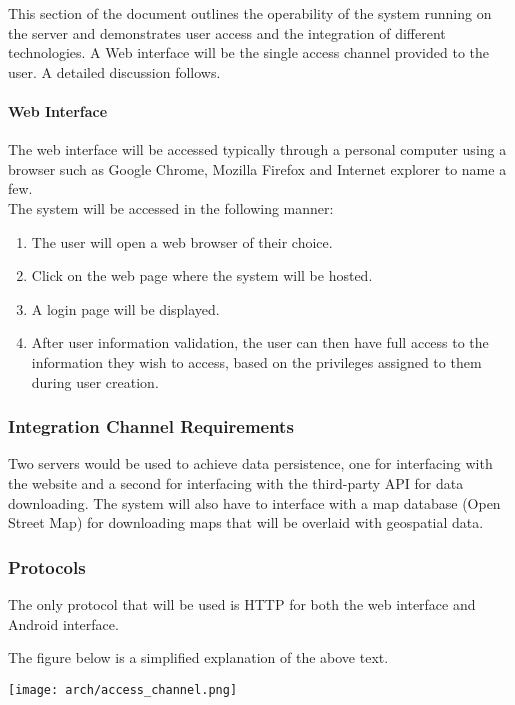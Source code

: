 
This section of the document outlines the operability of the system running on the server and demonstrates user access and the integration of different technologies. A Web interface will be the single access channel provided to the user. A detailed discussion follows.\\
\paragraph{Web Interface}
The web interface will be accessed typically through a personal computer using a browser such as Google Chrome, Mozilla Firefox and Internet explorer to name a few.\\
The system will be accessed in the following manner:
\begin{enumerate}
	\item The user will open a web browser of their choice.
	\item Click on the web page where the system will be hosted.
	\item A login page will be displayed.
	\item After user information validation, the user can then have full access to the information they wish to access, based on the privileges assigned to them during user creation.
\end{enumerate}
\subsubsection{Integration Channel Requirements}
Two servers would be used to achieve data persistence, one for interfacing with the website and a second for interfacing with the third-party API for data downloading. The system will also have to interface with a map database (Open Street Map) for downloading maps that will be overlaid with geospatial data. \\
\subsubsection{Protocols}
The only protocol that will be used is HTTP for both the web interface and Android interface. 


The figure below is a simplified explanation of the above text.
\begin{center}
	\texttt{[image: arch/access\_channel.png]}
\end{center}